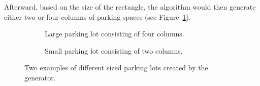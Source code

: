 Afterward, based on the size of the rectangle, the algorithm would then generate either two or four columns of parking spaces (see Figure~\ref{fig:sizebased}).
\begin{figure}[H]
  \centering
  \begin{subfigure}[b]{0.56\textwidth}
    \caption{Large parking lot consisting of four columns.}
  \end{subfigure}
  \quad
  \begin{subfigure}[b]{0.395\textwidth}
    \caption{Small parking lot consisting of two columns.}
  \end{subfigure}
    \caption{Two examples of different sized parking lots created by the generator.}
  \label{fig:sizebased}
\end{figure}

